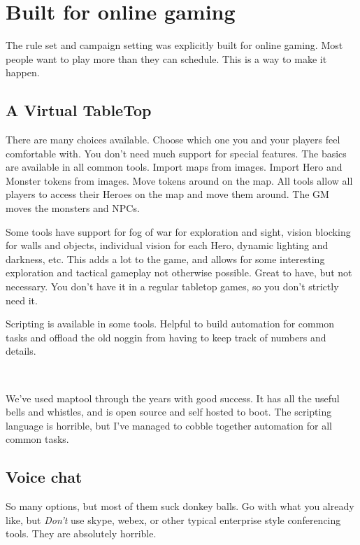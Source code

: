 \clearpage %

\section*{Built for online gaming}

The rule set and campaign setting was explicitly built for online gaming. Most people want to play more than they can schedule. This is a way to make it happen.


\subsection*{A Virtual TableTop}

There are many choices available. Choose which one you and your players feel comfortable with. You don't need much support for special features. The basics are available in all common tools. Import maps from images. Import Hero and Monster tokens from images. Move tokens around on the map. All tools allow all players to access their Heroes on the map and move them around. The GM moves the monsters and NPCs. 

Some tools have support for fog of war for exploration and sight, vision blocking for walls and objects, individual vision for each Hero, dynamic lighting and darkness, etc. 
This adds a lot to the game, and allows for some interesting exploration and tactical gameplay not otherwise possible.
Great to have, but not necessary. You don't have it in a regular tabletop games, so you don't strictly need it.

Scripting is available in some tools. Helpful to build automation for common tasks and offload the old noggin from having to keep track of numbers and details.

\

We've used maptool through the years with good success. It has all the useful bells and whistles, and is open source and self hosted to boot. The scripting language is horrible, but I've managed to cobble together automation for all common tasks.


\subsection*{Voice chat}

So many options, but most of them suck donkey balls. Go with what you already like, but \emph{Don't} use skype, webex, or other typical enterprise style conferencing tools. They are absolutely horrible.

